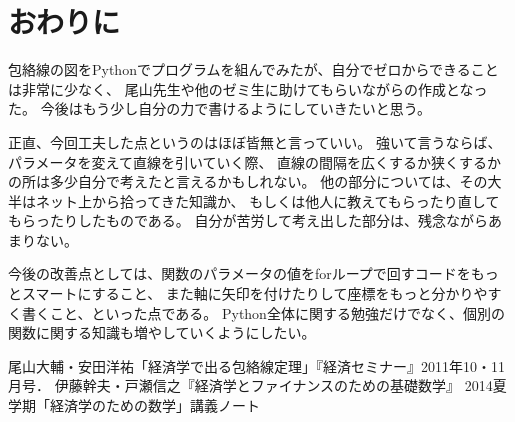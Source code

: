 \documentclass[11pt,a4j,fleqn]{jarticle}
\begin{document}
\section{おわりに}
包絡線の図をPythonでプログラムを組んでみたが、自分でゼロからできることは非常に少なく、
尾山先生や他のゼミ生に助けてもらいながらの作成となった。
今後はもう少し自分の力で書けるようにしていきたいと思う。

正直、今回工夫した点というのはほぼ皆無と言っていい。
強いて言うならば、パラメータを変えて直線を引いていく際、
直線の間隔を広くするか狭くするかの所は多少自分で考えたと言えるかもしれない。
他の部分については、その大半はネット上から拾ってきた知識か、
もしくは他人に教えてもらったり直してもらったりしたものである。
自分が苦労して考え出した部分は、残念ながらあまりない。

今後の改善点としては、関数のパラメータの値をforループで回すコードをもっとスマートにすること、
また軸に矢印を付けたりして座標をもっと分かりやすく書くこと、といった点である。
Python全体に関する勉強だけでなく、個別の関数に関する知識も増やしていくようにしたい。

\begin{thebibliography}{0}
尾山大輔・安田洋祐「経済学で出る包絡線定理」『経済セミナー』2011年10・11月号．
伊藤幹夫・戸瀬信之『経済学とファイナンスのための基礎数学』
2014夏学期「経済学のための数学」講義ノート
\end{thebibliography}
\end{document}
